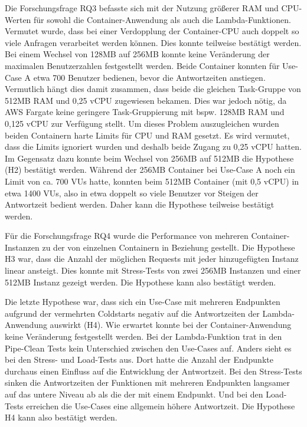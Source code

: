 Die Forschungsfrage RQ3 befasste sich mit der Nutzung größerer RAM und CPU-Werten für sowohl die Container-Anwendung als auch die Lambda-Funktionen. Vermutet wurde, dass bei einer Verdopplung der Container-CPU auch doppelt so viele Anfragen verarbeitet werden können. Dies konnte teilweise bestätigt werden. Bei einem Wechsel von 128MB auf 256MB konnte keine Veränderung der maximalen Benutzerzahlen festgestellt werden. Beide Container konnten für Use-Case A etwa 700 Benutzer bedienen, bevor die Antwortzeiten anstiegen. Vermutlich hängt dies damit zusammen, dass beide die gleichen Task-Gruppe von 512MB RAM und 0,25 vCPU zugewiesen bekamen. Dies war jedoch nötig, da AWS Fargate keine geringere Task-Gruppierung mit bspw. 128MB RAM und 0,125 vCPU zur Verfügung stellt. Um dieses Problem auszugleichen wurden beiden Containern harte Limits für CPU und RAM gesetzt. Es wird vermutet, dass die Limits ignoriert wurden und deshalb beide Zugang zu 0,25 vCPU hatten. Im Gegensatz dazu konnte beim Wechsel von 256MB auf 512MB die Hypothese (H2) bestätigt werden. Während der 256MB Container bei Use-Case A noch ein Limit von ca. 700 VUs hatte, konnten beim 512MB Container (mit 0,5 vCPU) in etwa 1400 VUs, also in etwa doppelt so viele Benutzer vor Steigen der Antwortzeit bedient werden. Daher kann die Hypothese teilweise bestätigt werden.

Für die Forschungsfrage RQ4 wurde die Performance von mehreren Container-Instanzen zu der von einzelnen Containern in Beziehung gestellt. Die Hypothese H3 war, dass die Anzahl der möglichen Requests mit jeder hinzugefügten Instanz linear ansteigt. Dies konnte mit Stress-Tests von zwei 256MB Instanzen und einer 512MB Instanz gezeigt werden. Die Hypothese kann also bestätigt werden.

Die letzte Hypothese war, dass sich ein Use-Case mit mehreren Endpunkten aufgrund der vermehrten Coldstarts negativ auf die Antwortzeiten der Lambda-Anwendung auswirkt (H4). Wie erwartet konnte bei der Container-Anwendung keine Veränderung festgestellt werden. Bei der Lambda-Funktion trat in den Pipe-Clean Tests kein Unterschied zwischen den Use-Cases auf. 
Anders sieht es bei den Stress- und Load-Tests aus. Dort hatte die Anzahl der Endpunkte durchaus einen Einfluss auf die Entwicklung der Antwortzeit. Bei den Stress-Tests sinken die Antwortzeiten der Funktionen mit mehreren Endpunkten langsamer auf das untere Niveau ab als die der mit einem Endpunkt. Und bei den Load-Tests erreichen die Use-Cases eine allgemein höhere Antwortzeit.
Die Hypothese H4 kann also bestätigt werden.

